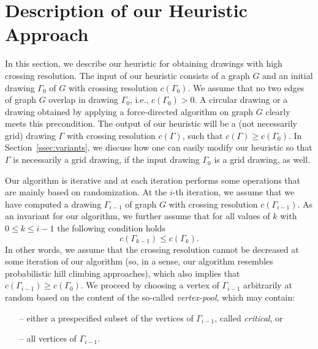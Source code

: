 \documentclass{comjnl}
\begin{document}
\section{Description of our Heuristic Approach}
\label{sec:algorithm}

In this section, we describe our heuristic for obtaining drawings with high crossing resolution. The input of our heuristic consists of a graph $G$ and an initial drawing $\Gamma_0$ of $G$ with crossing resolution $c(\Gamma_0)$. We assume that no two edges of graph $G$ overlap in drawing $\Gamma_0$, i.e., $c(\Gamma_0)>0$. A circular drawing or a drawing obtained by applying a force-directed algorithm on graph $G$ clearly meets this precondition. The output of our heuristic will be a (not necessarily grid) drawing $\Gamma$ with crossing resolution $c(\Gamma)$, such that $c(\Gamma) \geq c(\Gamma_0)$. In Section~\ref{ssec:variants}, we discuss how one can easily modify our heuristic so that $\Gamma$ is necessarily a grid drawing, if  the input drawing $\Gamma_0$ is a grid drawing, as well.  

Our algorithm is iterative and at each iteration performs some operations that are mainly based on randomization. At the $i$-th iteration, we assume that we have computed a drawing $\Gamma_{i-1}$ of graph $G$ with crossing resolution $c(\Gamma_{i-1})$. As an invariant for our algorithm, we further assume that for all values of $k$ with $0 \leq k \leq i-1$ the following condition holds %
%
$$c(\Gamma_{k-1}) \leq c(\Gamma_k).$$ 
%
In other words, we assume that the crossing resolution cannot be decreased at some iteration of our algorithm (so, in a sense, our algorithm resembles probabilistic hill climbing approaches), which also implies that $c(\Gamma_{i-1}) \geq c(\Gamma_{0})$. We proceed by choosing a vertex of $\Gamma_{i-1}$ arbitrarily at random based on the content of the so-called \emph{vertex-pool}, which may contain:

\begin{itemize}
\item[--] either a prespecified subset of the vertices of $\Gamma_{i-1}$, called \emph{critical}, or
\item[--] all vertices of $\Gamma_{i-1}$.
\end{itemize}
\end{document}
